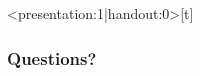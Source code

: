 \documentclass{beamer}
\begin{document}

\section{}
\begin{frame}<presentation:1|handout:0>[t]\frametitle{Questions?}
    \note{~}
    \begin{center}
    \end{center}
\end{frame}
%
\end{document}
